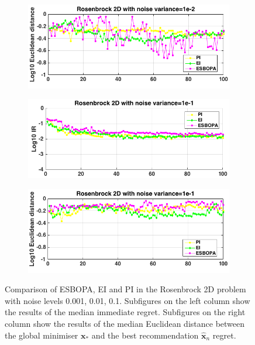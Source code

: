 \documentclass[a4paper,11pt]{report}
\begin{document}
\begin{figure} [H]
\begin{subfigure}{.5\textwidth}
		  \centering
		  \includegraphics[width=1\linewidth]{Rosenbrock1e-2_ESBOPAV4_Xnorm.png}
	\end{subfigure}
	\begin{subfigure}{.5\textwidth}
 		 \centering
 		 \includegraphics[width=1\linewidth]{Rosenbrock1e-1_ESBOPAV4_IR.png}
	\end{subfigure}	
	\begin{subfigure}{.5\textwidth}
		  \centering
		  \includegraphics[width=1\linewidth]{Rosenbrock1e-1_ESBOPAV4_Xnorm.png}
	\end{subfigure}
\caption{ Comparison of ESBOPA, EI and PI in the Rosenbrock 2D problem with noise levels 0.001, 0.01, 0.1. Subfigures on the left column show the results of the median immediate regret. Subfigures on the right column show the results of the median Euclidean distance between the global minimiser $\mathbf{x}_{*}$ and the best recommendation $ \hat{\mathbf{x}}_{n}$   regret.}
\end{figure}
\end{document}
